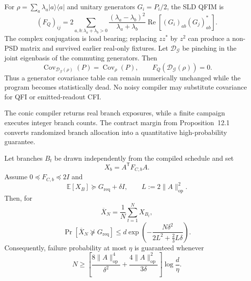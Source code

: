 \documentclass[11pt]{article}
\newcommand{\Sect}[1]{\vspace{0.35em}{\large\bfseries #1}\par\vspace{0.25em}}
\newcommand{\SubSect}[1]{\vspace{0.22em}{\large\bfseries #1}\par\vspace{0.18em}}
\newcommand{\Prop}[1]{\vspace{0.35em}{\bfseries #1}\par\vspace{0.12em}}
\begin{document}
\SubSect{6.7\quad Mixed-state QFI and covariance-preserving information death}
For $\rho=\sum_a\lambda_a\lvert a\rangle\!\langle a\rvert$ and unitary generators $G_i=P_i/2$, the SLD QFIM is
\begin{equation}
  (F_Q)_{ij}=2\!\sum_{a,b:\lambda_a+\lambda_b>0}
  \frac{(\lambda_a-\lambda_b)^2}{\lambda_a+\lambda_b}
  \operatorname{Re}\!\left[(G_i)_{ab}(G_j)_{ab}^{\ast}\right].
  \tag{78}
\end{equation}
The complex conjugation is load bearing; replacing $zz^\ast$ by $z^2$ can produce a non-PSD matrix and survived earlier real-only fixtures. Let $\mathcal D_{\mathcal G}$ be pinching in the joint eigenbasis of the commuting generators. Then
\begin{equation}
  \operatorname{Cov}_{\mathcal D_{\mathcal G}(\rho)}(P)=\operatorname{Cov}_{\rho}(P),
  \qquad F_Q(\mathcal D_{\mathcal G}(\rho))=0.
  \tag{79}
\end{equation}
Thus a generator covariance table can remain numerically unchanged while the program becomes statistically dead. No noisy compiler may substitute covariance for QFI or emitted-readout CFI.

\clearpage
\setcounter{page}{33}
\thispagestyle{plain}
\fontsize{9.7}{11.7}\selectfont
\Sect{12.4\quad Finite randomized campaigns}
The conic compiler returns real branch exposures, while a finite campaign executes integer branch counts. The contract margin from Proposition~12.1 converts randomized branch allocation into a quantitative high-probability guarantee.

\Prop{Proposition 12.3 (finite-shot contract guarantee).}
Let branches $B_t$ be drawn independently from the compiled schedule and set
\[
  X_b=A^{\mathsf T}F_{C,b}A.
\]
Assume $0\preceq F_{C,b}\preceq2I$ and
\begin{equation*}
  \mathbb E[X_B]\succeq G_{\mathrm{req}}+\delta I,
  \qquad L:=2\lVert A\rVert_{\mathrm{op}}^2.
\end{equation*}
Then, for
\[
  \overline X_N=\frac1N\sum_{t=1}^{N}X_{B_t},
\]
\begin{equation*}
  \Pr\!\left[\overline X_N\not\succeq G_{\mathrm{req}}\right]
  \le d\exp\!\left(
    -\frac{N\delta^2}{2L^2+\tfrac23L\delta}
  \right).
\end{equation*}
Consequently, failure probability at most $\eta$ is guaranteed whenever
\begin{equation*}
  N\ge
  \left[
    \frac{8\lVert A\rVert_{\mathrm{op}}^4}{\delta^2}
    +\frac{4\lVert A\rVert_{\mathrm{op}}^2}{3\delta}
  \right]\log\!\frac d\eta .
\end{equation*}
\end{document}
